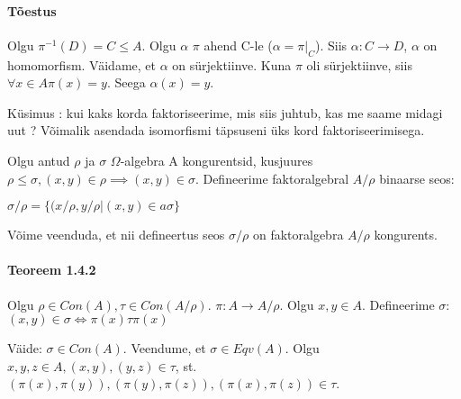 \documentclass[12pt]{article}
\begin{document}
\paragraph*{Tõestus}

Olgu $\pi^{-1}(D) = C \leq A$. Olgu $\alpha$ $\pi$ ahend C-le ($\alpha = \pi|_{C}$). Siis $\alpha : C \rightarrow D$, $\alpha$ on homomorfism. Väidame, et $\alpha$ on s\"urjektiinve. Kuna $\pi$ oli s\"urjektiinve, siis $\forall x \in A \pi(x) = y$. Seega $\alpha(x) = y$. 

K\"usimus : kui kaks korda faktoriseerime, mis siis juhtub, kas me saame midagi uut ? Võimalik asendada isomorfismi täpsuseni üks kord faktoriseerimisega. 

Olgu antud $\rho$ ja $\sigma$ $\Omega$-algebra A kongurentsid, kusjuures $\rho \leq \sigma, (x,y) \in \rho \implies (x,y) \in \sigma$. Defineerime faktoralgebral $A/ \rho$ binaarse seos:

$\sigma / \rho = \{(x / \rho, y / \rho  | (x,y) \in a \sigma \}$

Võime veenduda, et nii defineertus seos $\sigma / \rho$ on faktoralgebra $A / \rho$ kongurents.

\paragraph{Teoreem 1.4.2}

Olgu $\rho \in Con(A), \tau \in Con(A / \rho)$. $\pi : A \rightarrow A / \rho$. Olgu $x,y \in A$.  Defineerime $\sigma$: $(x,y) \in \sigma \iff \pi(x) \tau \pi(x)$

Väide: $\sigma \in Con(A)$. Veendume, et $\sigma \in Eqv(A)$. Olgu $x,y,z \in A, (x,y), (y,z) \in \tau$, st. $(\pi(x),\pi(y)), (\pi(y),\pi(z)), (\pi(x),\pi(z)) \in \tau$.
\end{document}
